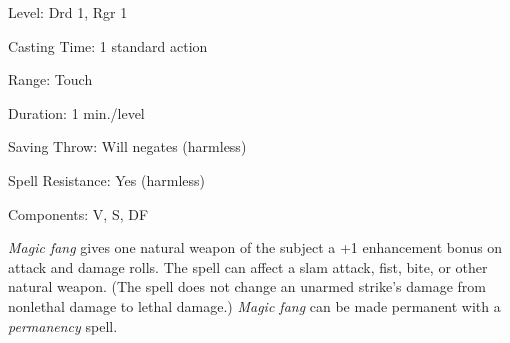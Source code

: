 
\begin{description*}
\item[Level:] Drd 1, Rgr 1
\item[Casting Time:] 1 standard action
\item[Range:] Touch
\item[Duration:] 1 min./level
\item[Saving Throw:] Will negates (harmless)
\item[Spell Resistance:] Yes (harmless)
\item[Components:] V, S, DF
\end{description*}

\textit{Magic fang} gives one natural weapon of the subject a +1 enhancement bonus
on attack and damage rolls. The spell can affect a slam attack, fist, bite, or
other natural weapon. (The spell does not change an unarmed strike's damage from
nonlethal damage to lethal damage.)
\textit{Magic fang} can be made permanent with a \textit{permanency} spell.